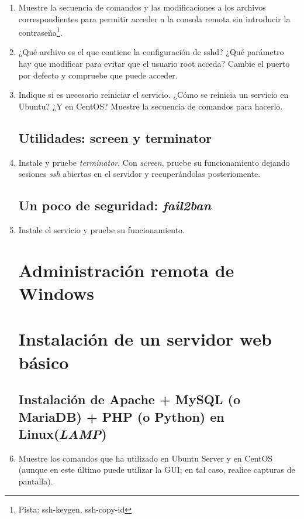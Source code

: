 \documentclass[paper=a4, fontsize=11pt]{scrartcl} %
\numberwithin{equation}{section} %
\numberwithin{figure}{section} %
\numberwithin{table}{section} %
\begin{document}
\begin{enumerate}
		\item Muestre la secuencia de comandos y las modificaciones a los archivos correspondientes
		para permitir acceder a la consola remota sin introducir la contraseña\footnote{Pista: ssh-keygen,
		ssh-copy-id}.
	
		\item ¿Qué archivo es el que contiene la configuración de sshd? ¿Qué parámetro hay que modificar
		para evitar que el usuario root acceda? Cambie el puerto por defecto y compruebe que puede
		acceder.
	
		\item Indique si es necesario reiniciar el servicio. ¿Cómo se reinicia un servicio en Ubuntu?
		¿Y en CentOS? Muestre la secuencia de comandos para hacerlo.
	
	\subsection{Utilidades: screen y terminator}
		\item Instale y pruebe \textit{terminator}. Con \textit{screen}, pruebe su funcionamiento
		dejando sesiones \textit{ssh} abiertas en el servidor y recuperándolas posteriomente.
	
	\subsection{Un poco de seguridad: \textit{fail2ban}}
		\item Instale el servicio y pruebe su funcionamiento.
	
	\section{Administración remota de Windows}
	\section{Instalación de un servidor web básico}
	\subsection{Instalación de Apache + MySQL (o MariaDB) + PHP (o Python) en Linux(\textit{LAMP})}
		\item Muestre los comandos que ha utilizado en Ubuntu Server y en CentOS (aunque en este último
		puede utilizar la GUI; en tal caso, realice capturas de pantalla).
		
		

\end{enumerate}
\end{document}
